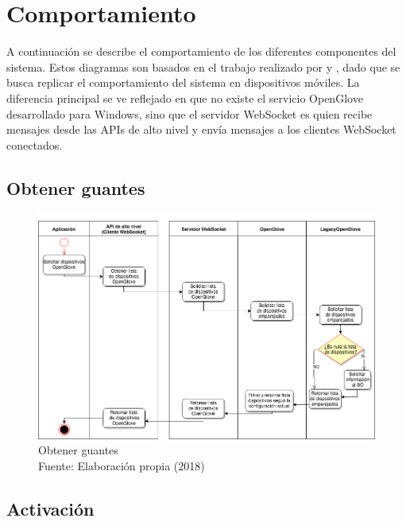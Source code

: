 \section{Comportamiento}
\label{seccion-comportamiento-apis}
A continuación se describe el comportamiento de los diferentes componentes del sistema. Estos diagramas son basados en el trabajo realizado por \cite{tesis-meneses-sebastian} y \cite{tesis-cerda-rodrigo}, dado que se busca replicar el comportamiento del sistema en dispositivos móviles. La diferencia principal se ve reflejado en que no existe el servicio OpenGlove desarrollado para Windows, sino que el servidor WebSocket es quien recibe mensajes desde las APIs de alto nivel y envía mensajes a los clientes WebSocket conectados.

\subsection{Obtener guantes}

\begin{figure}[H]
  \begin{center} 
   	\includegraphics[width=1.0\textwidth]{images/chapter04/ActivityDiagrams-GetGloves.png} 
    \caption[Obtener guantes]{Obtener guantes \\Fuente: Elaboración propia (2018)}
    \label{fig:activity-diagrams01-GetGloves}
  \end{center}
\end{figure}

\subsection{Activación}

